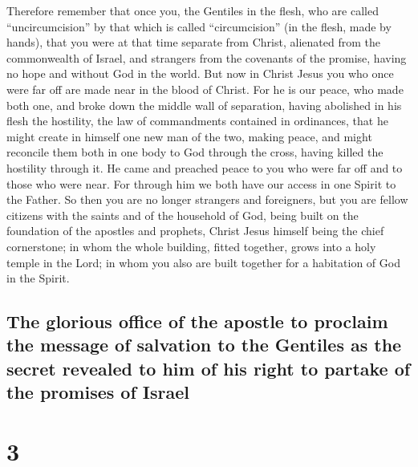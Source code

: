  Therefore remember that once you, the Gentiles in the
flesh, who are called ``uncircumcision'' by that which is called
``circumcision'' (in the flesh, made by hands),  that you
were at that time separate from Christ, alienated from the commonwealth
of Israel, and strangers from the covenants of the promise, having no
hope and without God in the world.  But now in Christ
Jesus you who once were far off are made near in the blood of Christ.
 For he is our peace, who made both one, and broke down
the middle wall of separation,  having abolished in his
flesh the hostility, the law of commandments contained in ordinances,
that he might create in himself one new man of the two, making peace,
 and might reconcile them both in one body to God through
the cross, having killed the hostility through it.  He
came and preached peace to you who were far off and to those who were
near.  For through him we both have our access in one
Spirit to the Father.  So then you are no longer
strangers and foreigners, but you are fellow citizens with the saints
and of the household of God,  being built on the
foundation of the apostles and prophets, Christ Jesus himself being the
chief cornerstone;  in whom the whole building, fitted
together, grows into a holy temple in the Lord;  in whom
you also are built together for a habitation of God in the Spirit.

\hypertarget{the-glorious-office-of-the-apostle-to-proclaim-the-message-of-salvation-to-the-gentiles-as-the-secret-revealed-to-him-of-his-right-to-partake-of-the-promises-of-israel}{%
\subsection{The glorious office of the apostle to proclaim the message
of salvation to the Gentiles as the secret revealed to him of his right
to partake of the promises of
Israel}\label{the-glorious-office-of-the-apostle-to-proclaim-the-message-of-salvation-to-the-gentiles-as-the-secret-revealed-to-him-of-his-right-to-partake-of-the-promises-of-israel}}

\hypertarget{section-2}{%
\section{3}\label{section-2}}

